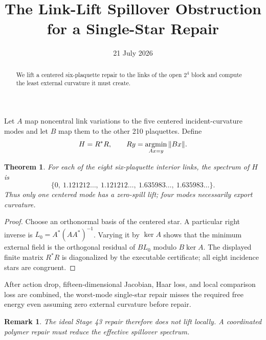 \documentclass[11pt]{article}\usepackage[margin=1in]{geometry}\usepackage{amsmath,amsthm}\newtheorem{theorem}{Theorem}\newtheorem{remark}{Remark}
\title{The Link-Lift Spillover Obstruction for a Single-Star Repair}\author{}\date{21 July 2026}
\begin{document}
\maketitle
\begin{abstract}We lift a centered six-plaquette repair to the links of the open $2^4$ block and compute the least external curvature it must create.\end{abstract}
Let $A$ map noncentral link variations to the five centered incident-curvature modes and let $B$ map them to the other 210 plaquettes. Define
\[H=R^*R,\qquad R y=\mathop{\rm argmin}_{Ax=y}\|Bx\|.
\]
\begin{theorem}For each of the eight six-plaquette interior links, the spectrum of $H$ is
\[\{0,\ 1.121212\ldots,\ 1.121212\ldots,\ 1.635983\ldots,\ 1.635983\ldots\}.
\]
Thus only one centered mode has a zero-spill lift; four modes necessarily export curvature.
\end{theorem}
\begin{proof}Choose an orthonormal basis of the centered star. A particular right inverse is $L_0=A^*(AA^*)^{-1}$. Varying it by $\ker A$ shows that the minimum external field is the orthogonal residual of $BL_0$ modulo $B\ker A$. The displayed finite matrix $R^*R$ is diagonalized by the executable certificate; all eight incidence stars are congruent.\end{proof}
After action drop, fifteen-dimensional Jacobian, Haar loss, and local comparison loss are combined, the worst-mode single-star repair misses the required free energy even assuming zero external curvature before repair.
\begin{remark}The ideal Stage 43 repair therefore does not lift locally. A coordinated polymer repair must reduce the effective spillover spectrum.\end{remark}
\end{document}
